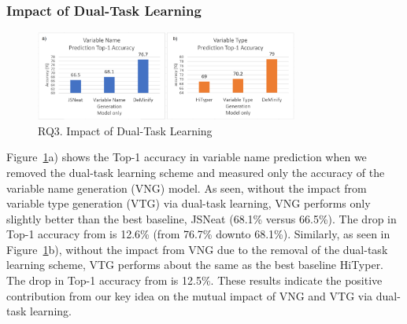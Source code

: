 \subsubsection{Impact of Dual-Task Learning}
\label{sec:dual-task-result}


\begin{figure}[thbp]
\begin{center}
\includegraphics[width=3.4in]{figures/dual-task-result}
\vspace{-8pt}
\caption{RQ3. Impact of Dual-Task Learning}
\label{dual-task-result}
\end{center}
\end{figure}

Figure~\ref{dual-task-result}a) shows the Top-1 accuracy in variable
name prediction when we removed the dual-task learning scheme and
measured only the accuracy of the variable name generation (VNG)
model.  As seen, without the impact from variable type generation
(VTG) via dual-task learning, VNG performs only slightly better than
the best baseline, JSNeat (68.1\% versus 66.5\%). The drop in Top-1
accuracy from {\tool} is 12.6\% (from 76.7\% downto
68.1\%). Similarly, as seen in Figure~\ref{dual-task-result}b),
without the impact from VNG due to the removal of the dual-task
learning scheme, VTG performs about the same as the best baseline
HiTyper. The drop in Top-1 accuracy from {\tool} is 12.5\%.
These results indicate the positive contribution from our key idea
on the mutual impact of VNG and VTG via dual-task learning.
